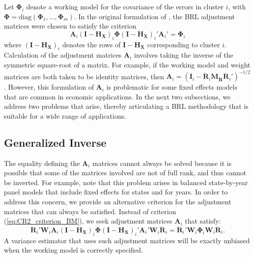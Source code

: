 \documentclass[12pt]{article}\usepackage[]{graphicx}\usepackage[]{color}
\newcommand{\bm}{\mathbf}
\newcommand{\bs}{\boldsymbol}
\begin{document}
Let $\bs\Phi_i$ denote a working model for the covariance of the errors in cluster $i$, with $\bs\Phi = \text{diag}\left(\bs\Phi_1,...,\bs\Phi_m\right)$. In the original formulation of \citet{Bell2002bias}, the BRL adjustment matrices were chosen to satisfy the criterion
\begin{equation}
\label{eq:CR2_criterion_BM}
\bm{A}_i \left(\bm{I} - \bm{H_X}\right)_i \bs\Phi \left(\bm{I} - \bm{H_X}\right)_i' \bm{A}_i'  =  \bs\Phi_i 
\end{equation}
where $\left(\bm{I} - \bm{H_X}\right)_i$ denotes the rows of $\bm{I} - \bm{H_X}$ corresponding to cluster $i$.
Calculation of the adjustment matrices $\bm{A}_i$ involves taking the inverse of the symmetric square-root of a matrix. 
For example, if the working model and weight matrices are both taken to be identity matrices, then $\bm{A}_i = \left(\bm{I}_i - \bm{\ddot{R}}_i\bm{M_{\ddot{R}}} \bm{\ddot{R}}_i'\right)^{-1/2}$. 
However, this formulation of $\bm{A}_i$ is problematic for some fixed effects models that are common in economic applications. 
In the next two subsections, we address two problems that arise, thereby articulating a BRL methodology that is suitable for a wide range of applications.

\subsection{Generalized Inverse}

The equality defining the $\bm{A}_i$ matrices cannot always be solved because it is possible that some of the matrices involved are not of full rank, and thus cannot be inverted. 
For example, \citet{Angrist2009mostly} note that this problem arises in balanced state-by-year panel models that include fixed effects for states and for years. 
In order to address this concern, we provide an alternative criterion for the adjustment matrices that can always be satisfied. 
Instead of criterion (\ref{eq:CR2_criterion_BM}), we seek adjustment matrices $\bm{A}_i$ that satisfy:
\begin{equation}
\label{eq:CR2_criterion}
\bm{\ddot{R}}_i' \bm{W}_i \bm{A}_i \left(\bm{I} - \bm{H_X}\right)_i \bs\Phi \left(\bm{I} - \bm{H_X}\right)_i' \bm{A}_i' \bm{W}_i \bm{\ddot{R}}_i = \bm{\ddot{R}}_i' \bm{W}_i \bs\Phi_i \bm{W}_i \bm{\ddot{R}}_i.
\end{equation}
A variance estimator that uses such adjustment matrices will be exactly unbiased when the working model is correctly specified.
\end{document}
